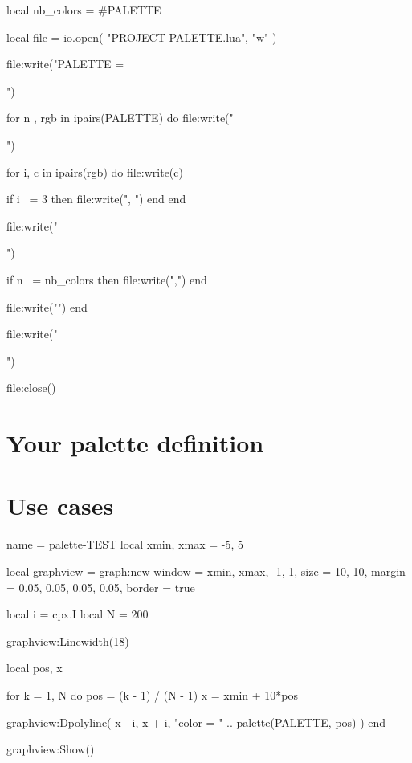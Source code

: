 \begin{luacode*}
local nb_colors = #PALETTE

local file = io.open(
  "PROJECT-PALETTE.lua",
  "w"
)

file:write("PALETTE = {\n")

for n , rgb in ipairs(PALETTE) do
  file:write("  {")

  for i, c in ipairs(rgb) do
    file:write(c)

    if i ~= 3 then
      file:write(", ")
    end
  end

  file:write("}")

  if n ~= nb_colors then
    file:write(",")
  end

  file:write("\n")
end

file:write("}\n")

file:close()
\end{luacode*}



\section*{Your palette definition}



\section*{Use cases}

\centering

\begin{luadraw}{name = palette-TEST}
local xmin, xmax = -5, 5

local graphview = graph:new{
  window = {xmin, xmax, -1, 1},
  size   = {10, 10},
  margin = {0.05, 0.05, 0.05, 0.05},
  border = true
}

local i = cpx.I
local N = 200

graphview:Linewidth(18)

local pos, x

for k = 1, N do
  pos = (k - 1) / (N - 1)
  x   = xmin + 10*pos

  graphview:Dpolyline(
    {x - i, x + i},
    "color = " .. palette(PALETTE, pos)
  )
end

graphview:Show()
\end{luadraw}


\bigskip


